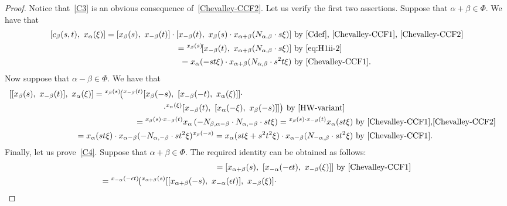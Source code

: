 \documentclass[oneside, 8pt]{amsart}
\theoremstyle{remark}
\theoremstyle{definition}
\numberwithin{lemma}{section}
\numberwithin{prop}{section}
\numberwithin{corollary}{section}
\numberwithin{externaltheorem}{section}
\numberwithin{equation}{section}
\begin{document}
\begin{proof}
Notice that~\ref{C3} is an obvious consequence of~\eqref{Chevalley-CCF2}. Let us verify the first two assertions. Suppose that $\alpha + \beta \in \Phi$.  We have that
\begin{align*} \nonumber [c_{\beta}(s, t),\ x_{\alpha}(\xi)] = [x_{\beta}(s),\ x_{-\beta}(t)] \cdot [x_{-\beta}(t),\ x_{\beta}(s)\cdot x_{\alpha + \beta}(N_{\alpha, \beta} \cdot s\xi)] &\text{ by~\eqref{Cdef}, \eqref{Chevalley-CCF1}, \eqref{Chevalley-CCF2}} \\
 = {}^{x_\beta(s)}\![x_{-\beta}(t),\ x_{\alpha+\beta}(N_{\alpha, \beta} \cdot s\xi)] &\text{ by~\eqref{eq:H1ii-2}} \\ = x_{\alpha}(- st\xi) \cdot x_{\alpha+\beta}(N_{\alpha,\beta} \cdot s^2t\xi) &\text{ by~\eqref{Chevalley-CCF1}.} \end{align*}
 Now suppose that $\alpha - \beta \in \Phi$. We have that
\begin{align*} \nonumber
\begin{split}[[x_\beta(s),\ x_{-\beta}(t)],\ x_{\alpha}(\xi)] = {}^{x_\beta(s)}\!\bigl( {}^{x_{-\beta}(t)}[x_\beta(-s),\ [x_{-\beta}(-t),\ x_{\alpha}(\xi)]] \cdot \hspace{50pt} \\ \cdot {}^{x_{\alpha}(\xi)}[x_{-\beta}(t),\ [ x_{\alpha}(-\xi),\ x_\beta(-s)]] \bigr)^{} & \text{ by~\eqref{HW-variant}}\end{split} \\
= {}^{x_\beta(s) \cdot x_{-\beta}(t)}x_{\alpha}\left(-N_{\beta, \alpha-\beta} \cdot N_{\alpha,-\beta} \cdot s t \xi\right) = {}^{ x_\beta(s) \cdot x_{-\beta}(t)}x_{\alpha}(s t \xi) & \text{ by~\eqref{Chevalley-CCF1},\eqref{Chevalley-CCF2}}\\
= x_{\alpha}(st\xi) \cdot x_{\alpha-\beta}(-N_{\alpha,-\beta}\cdot st^2\xi)^{x_\beta(-s)} = x_{\alpha}(st\xi + s^2t^2 \xi) \cdot x_{\alpha-\beta}(N_{-\alpha,\beta}\cdot st^2\xi) & \text{ by~\eqref{Chevalley-CCF1}.} \end{align*}
Finally, let us prove~\ref{C4}. Suppose that $\alpha + \beta \in \Phi$. The required identity can be obtained as follows:
\begin{align*}
[x_{\alpha+\beta}(s),\ x_{-\alpha-\beta}(t\xi)] = [x_{\alpha+\beta}(s),\ [x_{-\alpha}(-\epsilon t),\ x_{-\beta}(\xi)]]&\ \text{by~\eqref{Chevalley-CCF1}}\\
\begin{split}
    ={}^{x_{-\alpha}(-\epsilon t)}\!\bigl( {}^{x_{\alpha+\beta}(s)}[[x_{\alpha+\beta}(-s),\ x_{-\alpha}(\epsilon t)],\ x_{-\beta}(\xi)]  \cdot \hspace{70pt} \\

\end{split}
\end{align*}
\end{proof}
\end{document}
